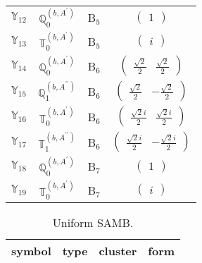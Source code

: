 \documentclass[fleqn,10pt,landscape]{article}
\begin{document}
\begin{itemize}
\begin{center}
\begin{longtable}{c|c|c|c}
$ \mathbb{Y}_{12} $ & $\mathbb{Q}_{0}^{(b,A^{\prime})}$ & B$_{5}$ & $\begin{pmatrix} 1 \end{pmatrix}$ \\
$ \mathbb{Y}_{13} $ & $\mathbb{T}_{0}^{(b,A^{\prime})}$ & B$_{5}$ & $\begin{pmatrix} i \end{pmatrix}$ \\ \hline
$ \mathbb{Y}_{14} $ & $\mathbb{Q}_{0}^{(b,A^{\prime})}$ & B$_{6}$ & $\begin{pmatrix} \frac{\sqrt{2}}{2} & \frac{\sqrt{2}}{2} \end{pmatrix}$ \\
$ \mathbb{Y}_{15} $ & $\mathbb{Q}_{1}^{(b,A^{\prime\prime})}$ & B$_{6}$ & $\begin{pmatrix} \frac{\sqrt{2}}{2} & - \frac{\sqrt{2}}{2} \end{pmatrix}$ \\
$ \mathbb{Y}_{16} $ & $\mathbb{T}_{0}^{(b,A^{\prime})}$ & B$_{6}$ & $\begin{pmatrix} \frac{\sqrt{2} i}{2} & \frac{\sqrt{2} i}{2} \end{pmatrix}$ \\
$ \mathbb{Y}_{17} $ & $\mathbb{T}_{1}^{(b,A^{\prime\prime})}$ & B$_{6}$ & $\begin{pmatrix} \frac{\sqrt{2} i}{2} & - \frac{\sqrt{2} i}{2} \end{pmatrix}$ \\ \hline
$ \mathbb{Y}_{18} $ & $\mathbb{Q}_{0}^{(b,A^{\prime})}$ & B$_{7}$ & $\begin{pmatrix} 1 \end{pmatrix}$ \\
$ \mathbb{Y}_{19} $ & $\mathbb{T}_{0}^{(b,A^{\prime})}$ & B$_{7}$ & $\begin{pmatrix} i \end{pmatrix}$ \\
\end{longtable}
\end{center}
\begin{center}
\renewcommand{\arraystretch}{1.3}
\begin{longtable}{c|c|c|c}
\caption{Uniform SAMB.}
 \\
 \hline \hline
symbol & type & cluster & form \\ \hline \endfirsthead


\end{longtable}
\end{center}
\end{itemize}
\end{document}
